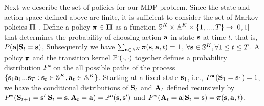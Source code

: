  


Next we describe the set of policies for our MDP problem. Since the state and action space defined above are finite, it is sufficient to consider the set of Markov policies $\mathbf{\Pi}$ \citep{putermanBook}. Define a policy $\pmb{\pi}\in\mathbf{\Pi}$ as a function $\mathbb{S}^K\times \mathbb{A}^K \times \{1,...,T\} \rightarrow [0,1]$ that determines the probability of choosing action $\mathbf{a}$ in state $\mathbf{s}$ at time $t$, that is, $P(\mathbf{a}|\mathbf{S}_t=\mathbf{s})$,  Subsequently we have $\sum_{\mathbf{a}\in\mathbb{A}^K}\pmb{\pi}(\mathbf{s},\mathbf{a},t)=1$, $\forall \mathbf{s}\in\mathbb{S}^K, \forall 1\leq t\leq T$. A policy $\pmb{\pi}$ and the transition kernel  $\mathbb{P}^{\cdot}(\cdot,\cdot)$ together defines a probability distribution $P^{\pmb{\pi}}$on the all possible paths of the process $\{\mathbf{s}_1\mathbf{a}_1...\mathbf{s}_T:\mathbf{s}_t\in \mathbb{S}^K, \mathbf{a}_t\in \mathbb{A}^K\}$. Starting at a fixed state $\mathbf{s}_1$, i.e., $P^{\pmb{\pi}}(\mathbf{S}_1=\mathbf{s}_1)=1$, we have the conditional distributions of $\mathbf{S}_t$ and $\mathbf{A}_t$ defined recursively by $P^{\pmb{\pi}}(\mathbf{S}_{t+1}=\mathbf{s}'|\mathbf{S}_t=\mathbf{s},\mathbf{A}_t=\mathbf{a})=\mathbb{P}^{\mathbf{a}}(\mathbf{s},\mathbf{s}')$ and $P^{\pmb{\pi}}(\mathbf{A}_t=\mathbf{a}|\mathbf{S}_t=\mathbf{s})=\pmb{\pi}(\mathbf{s},\mathbf{a},t)$. 

